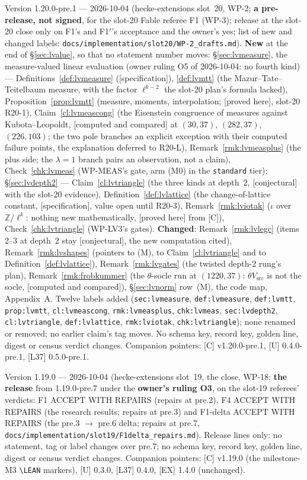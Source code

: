 \documentclass[11pt]{article}
\theoremstyle{remark}
\newcommand{\Z}{\mathbb{Z}}
\newcommand{\PROVED}{\textsf{[proved here]}}
\newcommand{\CONJ}{\textsf{[conjectural]}}
\newcommand{\CMPD}{\textsf{[computed and compared]}}   %
\newcommand{\SPEC}{\textsf{[specification]}}           %
\begin{document}
Version 1.20.0-pre.1 --- 2026-10-04 (hecke-extensions slot~20, WP-2; \textbf{a pre-release, not signed}, for the slot-20 Fable referee F1 (WP-3); release at the
slot-20 close only on F1's and F1$'$'s acceptance and the owner's yes; list of new and changed labels: \texttt{docs/implementation/slot20/WP-2\_drafts.md}). \textbf{New} at the end of
\S\ref{sec:lvalue}, so that no statement number moves: \S\ref{sec:lvmeasure}, the measure-valued \textsf{linear} evaluation (owner ruling O5 of 2026-10-04: no fourth kind) ---
Definitions~\ref{def:lvmeasure} (\SPEC), \ref{def:lvmtt} (the Mazur--Tate--Teitelbaum measure, with the factor $\ell^{k-2}$ the slot-20 plan's formula lacked), Proposition~\ref{prop:lvmtt}
(measure, moments, interpolation; \PROVED, slot-20 R20-1), Claim~\ref{cl:lvmeascong} (the Eisenstein congruence of measures against Kubota--Leopoldt, \CMPD{} at $(30,37)$,
$(282,37)$, $(226,103)$; the two pole branches an explicit exception with their computed failure points, the explanation deferred to R20-L), Remark~\ref{rmk:lvmeasplus} (the plus side;
the $\lambda=1$ branch pairs an observation, not a claim), Check~\ref{chk:lvmeas} (WP-MEAS's gate, arm (M0) in the \texttt{standard} tier); \S\ref{sec:lvdepth2} --- Claim~\ref{cl:lvtriangle}
(the three kinds at depth~$2$, \CONJ{} with the slot-20 evidence), Definition~\ref{def:lvlattice} (the change-of-lattice constant, \SPEC, value open until R20-3),
Remark~\ref{rmk:lviotak} ($\iota$ over $\Z/\ell^{k}$: nothing new mathematically, \PROVED{} from [C]), Check~\ref{chk:lvtriangle} (WP-LV3's gates). \textbf{Changed}: Remark~\ref{rmk:lvlegc}
(items 2--3 at depth~$2$ stay \CONJ, the new computation cited), Remark~\ref{rmk:lvshapes} (pointers to (M), to Claim~\ref{cl:lvtriangle} and to Definition~\ref{def:lvlattice}),
Remark~\ref{rmk:lvgates} (the twisted depth-$2$ rung's plan), Remark~\ref{rmk:frobkummer} (the $\theta$-socle run at $(1220,37)$: $\theta V_{\mathrm{src}}$ is not the socle, \CMPD), \S\ref{sec:lvnorm}
row~(M), the code map, Appendix~A. Twelve labels added (\texttt{sec:lvmeasure}, \texttt{def:lvmeasure}, \texttt{def:lvmtt}, \texttt{prop:lvmtt}, \texttt{cl:lvmeascong}, \texttt{rmk:lvmeasplus},
\texttt{chk:lvmeas}, \texttt{sec:lvdepth2}, \texttt{cl:lvtriangle}, \texttt{def:lvlattice}, \texttt{rmk:lviotak}, \texttt{chk:lvtriangle}); none renamed or removed; no earlier claim's tag moves. No
schema key, record key, golden line, digest or census verdict changes. Companion pointers: [C] v1.20.0-pre.1, [U] 0.4.0-pre.1, [L37] 0.5.0-pre.1.

Version 1.19.0 --- 2026-10-04 (hecke-extensions slot~19, the close, WP-18; \textbf{the release} from 1.19.0-pre.7 under the \textbf{owner's ruling O3},
on the slot-19 referees' verdicts: F1 ACCEPT WITH REPAIRS (repairs at pre.2), F4 ACCEPT WITH REPAIRS (the research results; repairs at pre.3) and
F1-delta ACCEPT WITH REPAIRS (the pre.3 $\to$ pre.6 delta; repairs at pre.7, \texttt{docs/implementation/slot19/F1delta\_repairs.md}). Release lines only: no statement,
tag or label changes over pre.7; no schema key, record key, golden line, digest or census verdict changes. Companion pointers: [C] v1.19.0 (the milestone-M3
\texttt{\textbackslash LEAN} markers), [U] 0.3.0, [L37] 0.4.0, [EX] 1.4.0 (unchanged).
\end{document}

